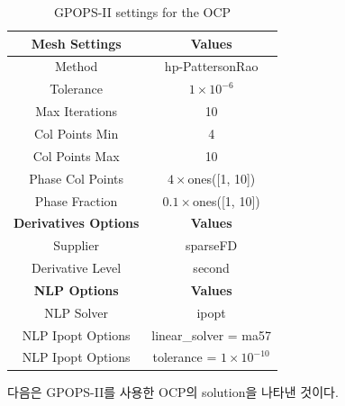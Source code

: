 \begin{table}[H]
	\begin{tabular}{|c|c|}
		\hline
		\textbf{Mesh Settings}       & \textbf{Values}                 \\
		\hline
		Method                       & hp-PattersonRao                 \\
		Tolerance                    & $1 \times 10^{-6}$              \\
		Max Iterations               & 10                              \\
		Col Points Min               & 4                               \\
		Col Points Max               & 10                              \\
		Phase Col Points             & $4 \times$ones([1, 10])         \\
		Phase Fraction               & $0.1 \times$ones([1, 10])       \\
		\hline
		\textbf{Derivatives Options} & \textbf{Values}                 \\
		\hline
		Supplier                     & sparseFD                        \\
		Derivative Level             & second                          \\
		\hline
		\textbf{NLP Options}         & \textbf{Values}                 \\
		\hline
		NLP Solver                   & ipopt                           \\
		NLP Ipopt Options            & linear\_solver = ma57           \\
		NLP Ipopt Options            & tolerance = $1 \times 10^{-10}$ \\
		\hline
	\end{tabular}
	\centering
	\caption{GPOPS-II settings for the OCP}
	\label{tab4}
\end{table}

다음은 GPOPS-II를 사용한 OCP의 solution을 나타낸 것이다.

